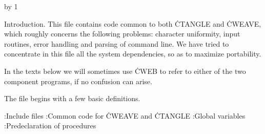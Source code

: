 






\def\v{\char'174} %

\def\title{Common code for CTANGLE and CWEAVE (Version 4.12.2)}
\def\topofcontents{\null\vfill
  \centerline{\titlefont Common code for {\ttitlefont CTANGLE} and
    {\ttitlefont CWEAVE}}
  \vskip 15pt
  \centerline{(Version 4.12.2)}
  \vfill}
\def\botofcontents{\vfill\titlefalse}
\def\contentspagenumber{29}
\def\title{APPENDIX D: COMMON}
\let\K=\leftarrow

\pageno=\contentspagenumber \advance\pageno by 1
\let\maybe=\iftrue


Introduction.  This file contains code common
to both \.{CTANGLE} and \.{CWEAVE}, which roughly concerns the following
problems: character uniformity, input routines, error handling and
parsing of command line.  We have tried to concentrate in this file
all the system dependencies, so as to maximize portability.

In the texts below we will
sometimes use \.{CWEB} to refer to either of the two component
programs, if no confusion can arise.

The file begins with a few basic definitions.

\Y\B{}:Include files\X\6
\ATH\6
:Common code for \.{CWEAVE} and \.{CTANGLE}\X\6
:Global variables\X\6
:Predeclaration of procedures\X\par
\fi

